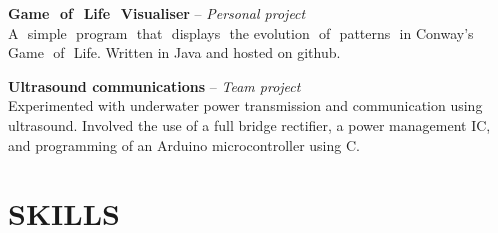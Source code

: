 \documentclass[paper=a4,fontsize=11pt]{scrartcl} %
\newcommand{\sepspace}{\vspace*{1em}}		%
\newcommand{\NewPart}[1]{\section*{\uppercase{\textcolor{PARTCOLOR}{#1}}}}
\newcommand{\ProjectEntry}[3]{
	\noindent
	\textbf{#1} -- \textit{#2} \\
	\textcolor{DESCOLOR}{#3}
	\sepspace
}
\newcommand{\SkillEntry}[2]{
	\noindent
	\textbf{#1}
	\begin{multicols}{3}
	\noindent
	\textcolor{DESCOLOR}{\textsc{#2}}
	\end{multicols}
	\sepspace
}
\begin{document}
\ProjectEntry{Game​ ​ of​ ​ Life​ ​ Visualiser}{Personal project}{A​ ​ simple​ ​ program​ ​ that​ ​ displays​ ​ the​ ​ evolution​ ​ of​ ​ patterns​ ​ in Conway’s​ ​ Game​ ​ of​ ​ Life. Written in Java and hosted on github.}

\ProjectEntry{Ultrasound communications}{Team project}{Experimented with underwater power transmission and communication using ultrasound. Involved the use of a full bridge rectifier, a power management IC, and programming of an Arduino microcontroller using C.}

\NewPart{Skills}
% 

\end{document}
